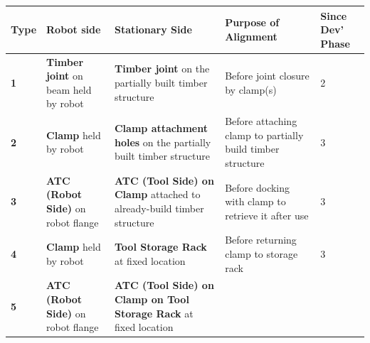 \documentclass[11pt]{book}
\begin{document}
\begin{table}[H]
\begin{adjustbox}{max width=\textwidth}
\begin{tabular}{p{1.22cm}p{5.13cm}p{3.94cm}p{3.89cm}p{1.72cm}}
\hline
\multicolumn{1}{|p{1.22cm}}{{\footnotesize \textbf{Type}}} & 
\multicolumn{1}{|p{5.13cm}}{{\footnotesize \textbf{Robot side}}} & 
\multicolumn{1}{|p{3.94cm}}{{\footnotesize \textbf{Stationary Side}}} & 
\multicolumn{1}{|p{3.89cm}}{{\footnotesize \textbf{Purpose of Alignment}}} & 
\multicolumn{1}{|p{1.72cm}|}{{\footnotesize \textbf{Since Dev’ Phase}}} \\ 
\hline
\multicolumn{1}{|p{1.22cm}}{{\footnotesize \textbf{1}}} & 
\multicolumn{1}{|p{5.13cm}}{{\footnotesize \textbf{Timber joint} on beam held by robot}} & 
\multicolumn{1}{|p{3.94cm}}{{\footnotesize \textbf{Timber joint} on the partially built timber structure}} & 
\multicolumn{1}{|p{3.89cm}}{{\footnotesize Before joint closure by clamp(s)}} & 
\multicolumn{1}{|p{1.72cm}|}{{\footnotesize 2}} \\ 
\hline
\multicolumn{1}{|p{1.22cm}}{{\footnotesize \textbf{2}}} & 
\multicolumn{1}{|p{5.13cm}}{{\footnotesize \textbf{Clamp }held by robot}} & 
\multicolumn{1}{|p{3.94cm}}{{\footnotesize \textbf{Clamp attachment holes} on the partially built timber structure}} & 
\multicolumn{1}{|p{3.89cm}}{{\footnotesize Before attaching clamp to partially build timber structure}} & 
\multicolumn{1}{|p{1.72cm}|}{{\footnotesize 3}} \\ 
\hline
\multicolumn{1}{|p{1.22cm}}{{\footnotesize \textbf{3}}} & 
\multicolumn{1}{|p{5.13cm}}{{\footnotesize \textbf{ATC (Robot Side) }on robot flange}} & 
\multicolumn{1}{|p{3.94cm}}{{\footnotesize \textbf{ATC (Tool Side) on Clamp} attached to already-build timber structure}} & 
\multicolumn{1}{|p{3.89cm}}{{\footnotesize Before docking with clamp to retrieve it after use}} & 
\multicolumn{1}{|p{1.72cm}|}{{\footnotesize 3}} \\ 
\hline
\multicolumn{1}{|p{1.22cm}}{{\footnotesize \textbf{4}}} & 
\multicolumn{1}{|p{5.13cm}}{{\footnotesize \textbf{Clamp }held by robot}} & 
\multicolumn{1}{|p{3.94cm}}{{\footnotesize \textbf{Tool Storage Rack }at fixed location}} & 
\multicolumn{1}{|p{3.89cm}}{{\footnotesize Before returning clamp to storage rack}} & 
\multicolumn{1}{|p{1.72cm}|}{{\footnotesize 3}} \\ 
\hline
\multicolumn{1}{|p{1.22cm}}{{\footnotesize \textbf{5}}} & 
\multicolumn{1}{|p{5.13cm}}{{\footnotesize \textbf{ATC (Robot Side) }on robot flange}} & 
\multicolumn{1}{|p{3.94cm}}{{\footnotesize \textbf{ATC (Tool Side) on Clamp on Tool Storage Rack }at fixed location} \newline
}
\end{tabular}
\end{adjustbox}
\end{table}
\end{document}
